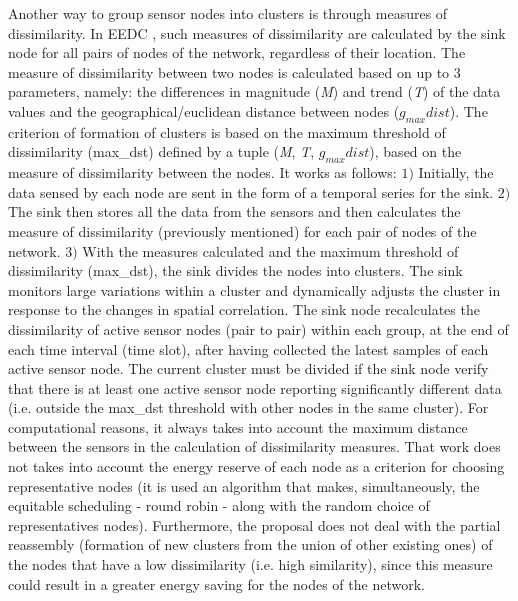 \documentclass[conference]{IEEEtran}
\begin{document}
Another way to group sensor nodes into clusters is through measures of
dissimilarity.
In EEDC \cite{Liu2007}, such measures of dissimilarity are calculated by the
sink node for all pairs of nodes of the network, regardless of their location.
The measure of dissimilarity between two nodes is calculated based on up to $3$
parameters, namely:
the differences in magnitude (\textit{M}) and trend (\textit{T}) of the data
values and the geographical/euclidean distance between nodes ($g_{max}dist$).
The criterion of formation of clusters is based on the maximum threshold of
dissimilarity (max\_dst) defined by a tuple (\textit{M}, \textit{T},
$g_{max}dist$), based on the measure of dissimilarity between the nodes. It
works as follows: $1)$ Initially, the data sensed by each node are sent in the
form of a temporal series for the sink. $2)$ The sink then stores all the data
from the sensors and then calculates the measure of dissimilarity (previously
mentioned) for each pair of nodes of the network. $3)$ With the measures
calculated and the maximum threshold of dissimilarity (max\_dst), the sink
divides the nodes into clusters. The sink monitors large variations within a
cluster and dynamically adjusts the cluster in response to the changes in
spatial correlation.
The sink node recalculates the dissimilarity of active sensor nodes (pair to
pair) within each group, at the end of each time interval (time slot), after
having collected the latest samples of each active sensor node. The current
cluster must be divided if the sink node verify that there is at least one
active sensor node reporting significantly different data (i.e. outside the
max\_dst threshold with other nodes in the same cluster).
For computational reasons, it always takes into account the maximum distance
between the sensors in the calculation of dissimilarity measures.
That work does not takes into account the energy reserve of each node as a
criterion for choosing representative nodes (it is used an algorithm that makes,
simultaneously, the equitable scheduling - round robin - along with the random
choice of representatives nodes).
Furthermore, the proposal does not deal with the partial reassembly (formation
of new clusters from the union of other existing ones) of the nodes that have a
low dissimilarity (i.e. high similarity), since this measure could result in a
greater energy saving for the nodes of the network.
\end{document}
